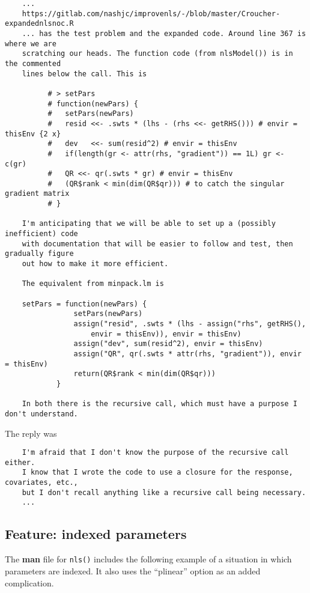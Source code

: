 \documentclass[
]{article}
\begin{document}
\begin{verbatim}
    ...
    https://gitlab.com/nashjc/improvenls/-/blob/master/Croucher-expandednlsnoc.R
    ... has the test problem and the expanded code. Around line 367 is where we are
    scratching our heads. The function code (from nlsModel()) is in the commented 
    lines below the call. This is

          # > setPars
          # function(newPars) {
          #   setPars(newPars)
          #   resid <<- .swts * (lhs - (rhs <<- getRHS())) # envir = thisEnv {2 x}
          #   dev   <<- sum(resid^2) # envir = thisEnv
          #   if(length(gr <- attr(rhs, "gradient")) == 1L) gr <- c(gr)
          #   QR <<- qr(.swts * gr) # envir = thisEnv
          #   (QR$rank < min(dim(QR$qr))) # to catch the singular gradient matrix
          # }

    I'm anticipating that we will be able to set up a (possibly inefficient) code
    with documentation that will be easier to follow and test, then gradually figure
    out how to make it more efficient.

    The equivalent from minpack.lm is

    setPars = function(newPars) {
                setPars(newPars)
                assign("resid", .swts * (lhs - assign("rhs", getRHS(),
                    envir = thisEnv)), envir = thisEnv)
                assign("dev", sum(resid^2), envir = thisEnv)
                assign("QR", qr(.swts * attr(rhs, "gradient")), envir = thisEnv)
                return(QR$rank < min(dim(QR$qr)))
            }

    In both there is the recursive call, which must have a purpose I don't understand.
\end{verbatim}

The reply was

\begin{verbatim}
    I'm afraid that I don't know the purpose of the recursive call either.  
    I know that I wrote the code to use a closure for the response, covariates, etc., 
    but I don't recall anything like a recursive call being necessary.
    ...
\end{verbatim}

\hypertarget{feature-indexed-parameters}{%
\subsection{Feature: indexed
parameters}\label{feature-indexed-parameters}}

The \textbf{man} file for \texttt{nls()} includes the following example
of a situation in which parameters are indexed. It also uses the
``plinear'' option as an added complication.
\end{document}
